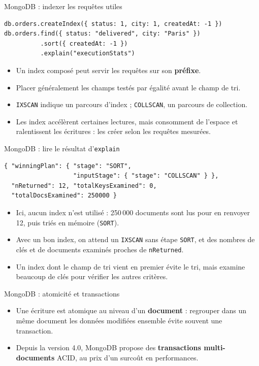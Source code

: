 \begin{frame}[fragile]{MongoDB : indexer les requêtes utiles}
    \begin{verbatim}
db.orders.createIndex({ status: 1, city: 1, createdAt: -1 })
db.orders.find({ status: "delivered", city: "Paris" })
          .sort({ createdAt: -1 })
          .explain("executionStats")
\end{verbatim}
    \begin{itemize}
        \item Un index composé peut servir les requêtes sur son
              \textbf{préfixe}.
        \item Placer généralement les champs testés par égalité avant le champ
              de tri.
        \item \texttt{IXSCAN} indique un parcours d'index ; \texttt{COLLSCAN},
              un parcours de collection.
        \item Les index accélèrent certaines lectures, mais consomment de
              l'espace et ralentissent les écritures : les créer selon les
              requêtes mesurées.
    \end{itemize}
\end{frame}

\begin{frame}[fragile]{MongoDB : lire le résultat d'\texttt{explain}}
    \begin{verbatim}
{ "winningPlan": { "stage": "SORT",
                   "inputStage": { "stage": "COLLSCAN" } },
  "nReturned": 12, "totalKeysExamined": 0,
  "totalDocsExamined": 250000 }
\end{verbatim}
    \begin{itemize}
        \item Ici, aucun index n'est utilisé : 250\,000 documents sont lus pour
              en renvoyer 12, puis triés en mémoire (\texttt{SORT}).
        \item Avec un bon index, on attend un \texttt{IXSCAN} sans étape
              \texttt{SORT}, et des nombres de clés et de documents examinés
              proches de \texttt{nReturned}.
        \item Un index dont le champ de tri vient en premier évite le tri, mais
              examine beaucoup de clés pour vérifier les autres critères.
    \end{itemize}
\end{frame}

\begin{frame}{MongoDB : atomicité et transactions}
    \begin{itemize}
        \item Une écriture est atomique au niveau d'un \textbf{document} :
              regrouper dans un même document les données modifiées ensemble
              évite souvent une transaction.
        \item Depuis la version 4.0, MongoDB propose des \textbf{transactions
              multi-documents} ACID, au prix d'un surcoût en performances.
    \end{itemize}
\end{frame}

